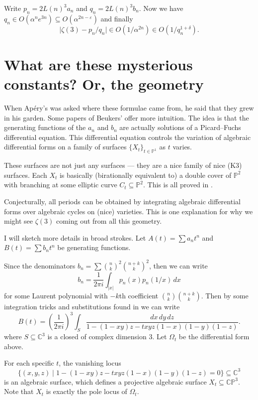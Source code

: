 \documentclass[12 pt, letterpaper]{amsart}
\begin{document}
Write $p_{n} = 2 L(n)^{3} a_{n}$ and $q_{n} = 2 L(n)^{3} b_{n}$. Now we have $q_{n} \in O(\alpha^{n} e^{3n}) \subseteq O(\alpha^{2n - \varepsilon})$ and finally
\[
	\lvert \zeta(3) - p_{n} / q_{n} \rvert \in O(1 / \alpha^{2n}) \in O(1 / q_{n}^{1 + \delta}).
\]

\section{What are these mysterious constants? Or, the geometry}

When Ap\'ery's was asked where these formulae came from, he said that they grew in his garden. Some papers of Beukers' offer more intuition. The idea is that the generating functions of the $a_{n}$ and $b_{n}$ are actually solutions of a Picard--Fuchs differential equation. This differential equation controls the variation of algebraic differential forms on a family of surfaces $\{ X_{t} \}_{t \in \mathbb{P}^{1}}$ as $t$ varies.

These surfaces are not just any surfaces --- they are a nice family of nice (K3) surfaces. Each $X_{t}$ is basically (birationally equivalent to) a double cover of $\mathbb{P}^{2}$ with branching at some elliptic curve $C_{t} \subseteq \mathbb{P}^{2}$. This is all proved in \cite{k3-surfaces-1984}.

Conjecturally, all periods can be obtained by integrating algebraic differential forms over algebraic cycles on (nice) varieties. This is one explanation for why we might see $\zeta(3)$ coming out from all this geometry.

I will sketch more details in broad strokes. Let $A(t) = \sum a_{n} t^{n}$ and $B(t) = \sum b_{n} t^{n}$ be generating functions.

Since the denominators $b_{n} = \sum \binom{n}{k}^{2} \binom{n + k}{k}^{2}$, then we can write
\[
	b_{n} = \frac{1}{2 \pi i} \int_{\lvert x \rvert} p_{n}(x) p_{n}(1 / x) \, dx 
\]
for some Laurent polynomial with $-k$th coefficient $\binom{n}{k} \binom{n + k}{k}$. Then by some integration tricks and substitutions found in \cite{beukers-1979} we can write
\[
	B(t) = \left (\frac{1}{2 \pi i} \right )^{3} \int_{S} \frac{dx \, dy \, dz}{1 - (1 - xy)z - txyz(1 - x)(1 - y)(1 - z)}.
\]
where $S \subseteq \mathbb{C}^{3}$ is a closed of complex dimension $3$. Let $\Omega_{t}$ be the differential form above.

For each specific $t$, the vanishing locus
\[
	\{ (x, y, z) \mid 1 - (1 - xy)z - txyz(1 - x)(1 - y)(1 - z) = 0 \} \subseteq \mathbb{C}^{3}
\]
is an algebraic surface, which defines a projective algebraic surface $X_{t} \subseteq \mathbb{C} \mathbb{P}^{3}$. Note that $X_{t}$ is exactly the pole locus of $\Omega_{t}$. 
\end{document}
